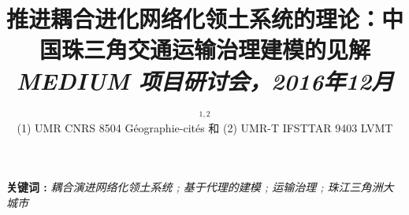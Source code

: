 


\title{%
推进耦合进化网络化领土系统的理论：中国珠三角交通运输治理建模的见解
\\\bigskip
\bigskip
\bigskip
\textit{MEDIUM 项目研讨会，2016年12月}
}\bigskip
\bigskip
\author{$^{1,2}$\\
\small(1) UMR CNRS 8504 Géographie-cités 和 (2) UMR-T IFSTTAR 9403 LVMT
}
\date{}

\maketitle

\justify




\vspace{0.2cm}

\textbf{关键词 : }\textit{耦合演进网络化领土系统 ; 基于代理的建模 ; 运输治理 ; 珠江三角洲大城市}

\vspace{0.5cm}

